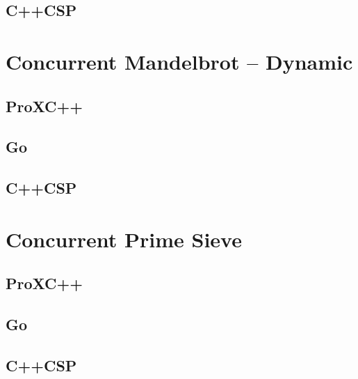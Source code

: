 \subsection*{C++CSP}



\section*{Concurrent Mandelbrot -- Dynamic}

\subsection*{ProXC++}


\subsection*{Go}


\subsection*{C++CSP}



\section*{Concurrent Prime Sieve}

\subsection*{ProXC++}


\subsection*{Go}


\subsection*{C++CSP}

